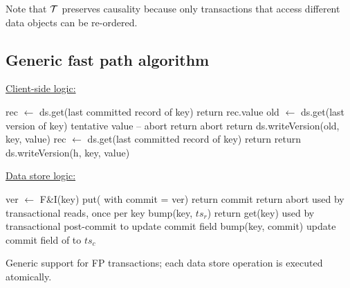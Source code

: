 Note that  ${\cal T}$  preserves causality because 
only transactions that  access different data objects can be re-ordered.


\subsection{Generic fast path algorithm}
\label{ssec:fast-algorithm}



\begin{algorithm}[htb]
\small

\underline{Client-side logic:}
\begin{algorithmic}
{}
\State rec  $\leftarrow$ ds.get(last committed record of key) 
\State  return rec.value
\EndProcedure
{} 
	\State old $\leftarrow$ ds.get(last version of key)
	  \Comment  tentative value -- abort 
		\State return abort 
	\EndIf
	\State return {ds.writeVersion}(old, key, value)
\EndProcedure
{} 
\State rec  $\leftarrow$ ds.get(last committed record of key) 
\State  return 
\EndProcedure
{} 
\State return {ds.writeVersion}(h, key, value)
\EndProcedure
\Statex
\end{algorithmic}

\underline{Data store logic:}
\begin{algorithmic}
{} 
	\State ver $\leftarrow$ F\&I(key)  
	\State put( with commit = ver)  
	\State return commit
	\Else \State return abort \EndIf
\EndProcedure
{} 
\Statex \Comment used by transactional reads, once per key 
\State bump(key, $ts_r$)
\State return get(key)
\EndProcedure
{} 
\Statex \Comment used by transactional post-commit to update commit field 
\State bump(key, commit)
\State update commit field of  to $ts_c$
\EndProcedure
{}
\end{algorithmic}
\caption{Generic support for FP transactions; each data store operation is executed atomically.}
\label{alg:fp}
\end{algorithm}

